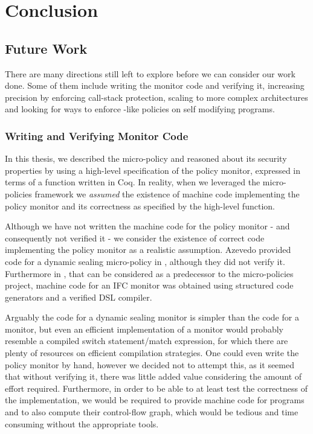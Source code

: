 \chapter{Conclusion}

\section{Future Work}

There are many directions still left to explore before we can consider
our work done. Some of them include writing the \CFI monitor code and
verifying it, increasing precision by enforcing call-stack protection,
scaling to more complex architectures and looking for ways to enforce
\CFI-like policies on self modifying programs.

\subsection{Writing and Verifying Monitor Code}

In this thesis, we described the \CFI micro-policy and reasoned about
its security properties by using a high-level specification of the
policy monitor, expressed in terms of a \TRANSFER function written in
Coq. In reality, when we leveraged the micro-policies framework we
\emph{assumed} the existence of machine code implementing the \CFI
policy monitor and its correctness as specified by the high-level
\TRANSFER function.

Although we have not written the machine code for the policy monitor -
and consequently not verified it - we consider the existence of
correct code implementing the policy monitor as a realistic
assumption. Azevedo \ETAL provided code for a dynamic sealing
micro-policy in \cite{popl2015}, although they did not verify it.
Furthermore in \cite{PicoCoq2013}, that can be considered as a predecessor
to the micro-policies project, machine code for an IFC
monitor was obtained using structured code generators and a verified
DSL compiler.

Arguably the code for a dynamic sealing monitor is simpler than the
code for a \CFI monitor, but even an efficient implementation of a
\CFI monitor would probably resemble a compiled switch statement/match
expression, for which there are plenty of resources on efficient
compilation strategies. One could even write the \CFI policy monitor
by hand, however we decided not to attempt this, as it seemed that
without verifying it, there was little added value considering the
amount of effort required. Furthermore, in order to be able to at
least test the correctness of the implementation, we would be required
to provide machine code for programs and to also compute their control-flow
graph, which would be tedious and time consuming without the appropriate tools.

